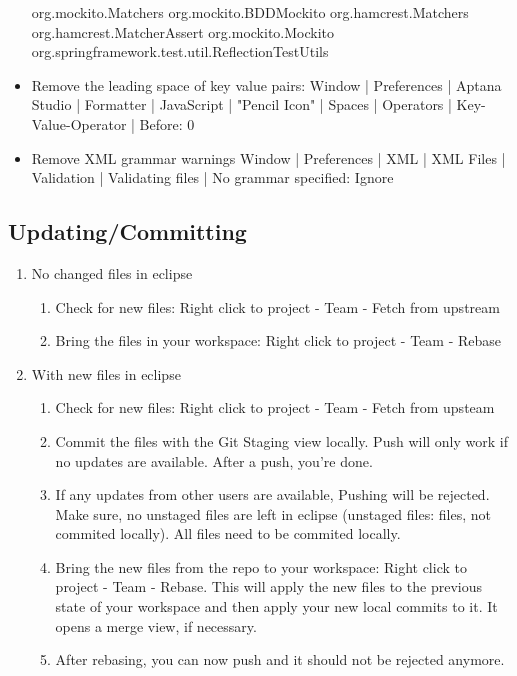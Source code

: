 \begin{itemize}
	org.mockito.Matchers\newline
	org.mockito.BDDMockito\newline
	org.hamcrest.Matchers\newline
	org.hamcrest.MatcherAssert\newline
	org.mockito.Mockito\newline
	org.springframework.test.util.ReflectionTestUtils\newline
	\item Remove the leading space of key value pairs:\newline
	Window | Preferences | Aptana Studio | Formatter | JavaScript | "Pencil Icon" | Spaces | Operators | Key-Value-Operator | Before: 0
	\item Remove XML grammar warnings \newline
	Window | Preferences | XML | XML Files | Validation | Validating files | No grammar specified: Ignore
\end{itemize}


\subsection{Updating/Committing}
\begin{enumerate}
	\item No changed files in eclipse
	\begin{enumerate}
		\item Check for new files: Right click to project - Team - Fetch from upstream
		\item Bring the files in your workspace: Right click to project - Team - Rebase
	\end{enumerate}
	\item With new files in eclipse
	\begin{enumerate}
		\item Check for new files: Right click to project - Team - Fetch from upsteam
		\item Commit the files with the Git Staging view locally. Push will only work if no updates are available. After a push, you’re done.
		\item If any updates from other users are available, Pushing will be rejected. Make sure, no unstaged files are left in eclipse (unstaged files: files, not commited locally). All files need to be commited locally.
		\item Bring the new files from the repo to your workspace: Right click to project - Team - Rebase. This will apply the new files to the previous state of your workspace and then apply your new local commits to it. It opens a merge view, if necessary.
		\item After rebasing, you can now push and it should not be rejected anymore.
	\end{enumerate}
\end{enumerate}


